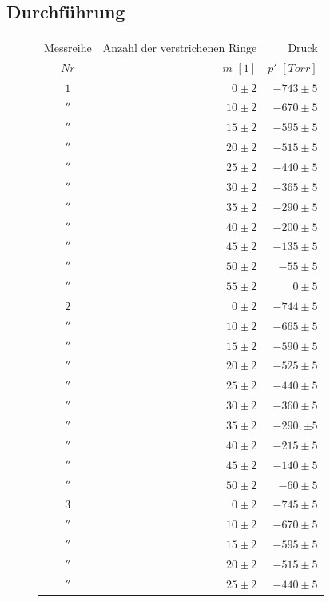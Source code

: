 \documentclass[a4paper,10pt]{article}
\begin{document}
\subsection[Durchführung]{Durchführung\fnrefb}
\unboldmath
\begin{figure}
\centering
{}
\begin{threeparttable}
\begin{tabular}{crr}
\toprule
Messreihe & Anzahl der verstrichenen Ringe & Druck \\
\( Nr\)&\boldmath\(m\) \unboldmath\( [1] \)&\boldmath\( p'\) \unboldmath\( [Torr]\) \\
\midrule
\(1\)&\(0\pm2\)&\(-743\pm5\)\\
\(''\)&\(10\pm2\)&\(-670\pm5\)\\
\(''\)&\(15\pm2\)&\(-595\pm5\)\\
\(''\)&\(20\pm2\)&\(-515\pm5\)\\
\(''\)&\(25\pm2\)&\(-440\pm5\)\\
\(''\)&\(30\pm2\)&\(-365\pm5\)\\
\(''\)&\(35\pm2\)&\(-290\pm5\)\\
\(''\)&\(40\pm2\)&\(-200\pm5\)\\
\(''\)&\(45\pm2\)&\(-135\pm5\)\\
\(''\)&\(50\pm2\)&\(-55\pm5\)\\
\(''\)&\(55\pm2\)&\(0\pm5\)\\
\midrule
\(2\)&\(0\pm2\)&\(-744\pm5\)\\
\(''\)&\(10\pm2\)&\(-665\pm5\)\\
\(''\)&\(15\pm2\)&\(-590\pm5\)\\
\(''\)&\(20\pm2\)&\(-525\pm5\)\\
\(''\)&\(25\pm2\)&\(-440\pm5\)\\
\(''\)&\(30\pm2\)&\(-360\pm5\)\\
\(''\)&\(35\pm2\)&\(-290,\pm5\)\\
\(''\)&\(40\pm2\)&\(-215\pm5\)\\
\(''\)&\(45\pm2\)&\(-140\pm5\)\\
\(''\)&\(50\pm2\)&\(-60\pm5\)\\
\midrule
\(3\)&\(0\pm2\)&\(-745\pm5\)\\
\(''\)&\(10\pm2\)&\(-670\pm5\)\\
\(''\)&\(15\pm2\)&\(-595\pm5\)\\
\(''\)&\(20\pm2\)&\(-515\pm5\)\\
\(''\)&\(25\pm2\)&\(-440\pm5\)\\

\end{tabular}
\end{threeparttable}
\end{figure}
\end{document}
